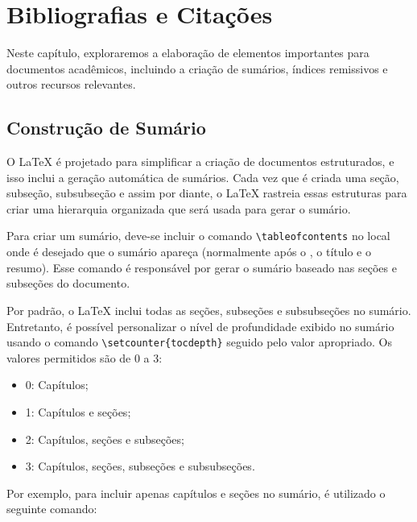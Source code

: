 %
%
%
\chapter{Bibliografias e Cita\c c\~oes}
\label{intro} %

Neste capítulo, exploraremos a elaboração de elementos importantes para documentos acadêmicos, incluindo a criação de sumários, índices remissivos e outros recursos relevantes.

\section{Construção de Sum\'ario}
\label{sec:1}

O \LaTeX{} é projetado para simplificar a criação de documentos estruturados, e isso inclui a geração automática de sumários. Cada vez que \'e criada uma seção, subseção, subsubseção e assim por diante, o \LaTeX{} rastreia essas estruturas para criar uma hierarquia organizada que será usada para gerar o sumário.

\noindent Para criar um sumário, deve-se incluir o comando \verb|\tableofcontents| no local onde \'e desejado que o sumário apareça (normalmente ap\'os o \verb||, o título e o resumo). Esse comando é responsável por gerar o sumário baseado nas seções e subseções do documento.

\noindent Por padrão, o \LaTeX{} inclui todas as seções, subseções e subsubseções no sumário. Entretanto, é possível personalizar o nível de profundidade exibido no sumário usando o comando \verb|\setcounter{tocdepth}| seguido pelo valor apropriado. Os valores permitidos são de 0 a 3:
\begin{itemize}
    \item 0: Capítulos;
    \item 1: Capítulos e seções;
    \item 2: Capítulos, seções e subseções;
    \item 3: Capítulos, seções, subseções e subsubseções.
\end{itemize}
Por exemplo, para incluir apenas capítulos e seções no sumário, \'e utilizado o seguinte comando:


